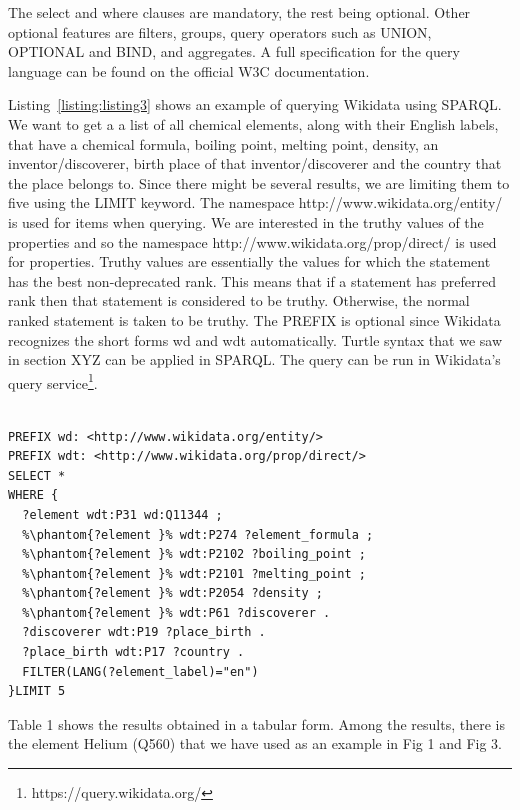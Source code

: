 The select and where clauses are mandatory, the rest being optional. Other optional features are filters, groups, query operators such as UNION, OPTIONAL and BIND, and aggregates. A full specification for the query language can be found on the official W3C documentation\cite{Seaborn}.

Listing~\ref{listing:listing3} shows an example of querying Wikidata using SPARQL. We want to get a a list of all chemical elements, along with their English labels, that have a chemical formula, boiling point, melting point, density, an inventor/discoverer, birth place of that inventor/discoverer and the country that the place belongs to. Since there might be several results, we are limiting them to five using the LIMIT keyword. The namespace http://www.wikidata.org/entity/ is used for items when querying. We are interested in the truthy values of the properties and so the namespace http://www.wikidata.org/prop/direct/ is used for properties. Truthy values are essentially the values for which the statement has the best non-deprecated rank. This means that if a statement has preferred rank then that statement is considered to be truthy. Otherwise, the normal ranked statement is taken to be truthy. The PREFIX is optional since Wikidata recognizes the short forms wd and wdt automatically. Turtle syntax that we saw in section XYZ can be applied in SPARQL. The query can be run in Wikidata's query service\footnote{https://query.wikidata.org/}.  

\begin{minipage}{\linewidth}
\begin{lstlisting}[label=listing:listing3, caption={Querying Wikidata with SPARQL}, language=SPARQL]

PREFIX wd: <http://www.wikidata.org/entity/>
PREFIX wdt: <http://www.wikidata.org/prop/direct/>
SELECT *
WHERE {
  ?element wdt:P31 wd:Q11344 ;
  %\phantom{?element }% wdt:P274 ?element_formula ; 
  %\phantom{?element }% wdt:P2102 ?boiling_point ;
  %\phantom{?element }% wdt:P2101 ?melting_point ;
  %\phantom{?element }% wdt:P2054 ?density ;
  %\phantom{?element }% wdt:P61 ?discoverer .
  ?discoverer wdt:P19 ?place_birth .
  ?place_birth wdt:P17 ?country .
  FILTER(LANG(?element_label)="en")
}LIMIT 5

\end{lstlisting}
\end{minipage}

Table 1 shows the results obtained in a tabular form. Among the results, there is the element Helium (Q560) that we have used as an example in Fig 1 and Fig 3. 

